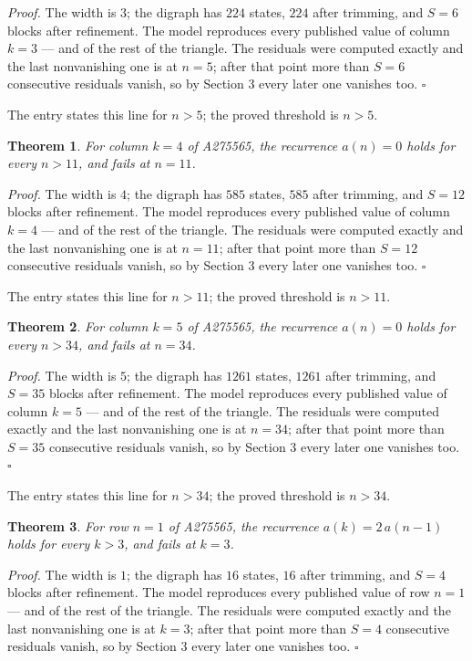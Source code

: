 \documentclass[11pt]{article}
\newtheorem{theorem}{Theorem}
\theoremstyle{definition}
\begin{document}
{\itshape Proof.} The width is $3$; the digraph has $224$ states, $224$ after trimming, and $S = 6$ blocks after refinement. The model reproduces every published value of column $k = 3$ --- and of the rest of the triangle. The residuals were computed exactly and the last nonvanishing one is at $n = 5$; after that point more than $S = 6$ consecutive residuals vanish, so by Section 3 every later one vanishes too. $\square$

The entry states this line for $n > 5$; the proved threshold is $n > 5$.

\begin{theorem} For column $k = 4$ of A275565, the recurrence $a(n) = 0$ holds for every $n > 11$, and fails at $n = 11$.\end{theorem}

{\itshape Proof.} The width is $4$; the digraph has $585$ states, $585$ after trimming, and $S = 12$ blocks after refinement. The model reproduces every published value of column $k = 4$ --- and of the rest of the triangle. The residuals were computed exactly and the last nonvanishing one is at $n = 11$; after that point more than $S = 12$ consecutive residuals vanish, so by Section 3 every later one vanishes too. $\square$

The entry states this line for $n > 11$; the proved threshold is $n > 11$.

\begin{theorem} For column $k = 5$ of A275565, the recurrence $a(n) = 0$ holds for every $n > 34$, and fails at $n = 34$.\end{theorem}

{\itshape Proof.} The width is $5$; the digraph has $1261$ states, $1261$ after trimming, and $S = 35$ blocks after refinement. The model reproduces every published value of column $k = 5$ --- and of the rest of the triangle. The residuals were computed exactly and the last nonvanishing one is at $n = 34$; after that point more than $S = 35$ consecutive residuals vanish, so by Section 3 every later one vanishes too. $\square$

The entry states this line for $n > 34$; the proved threshold is $n > 34$.

\begin{theorem} For row $n = 1$ of A275565, the recurrence $a(k) = 2\,a(n-1)$ holds for every $k > 3$, and fails at $k = 3$.\end{theorem}

{\itshape Proof.} The width is $1$; the digraph has $16$ states, $16$ after trimming, and $S = 4$ blocks after refinement. The model reproduces every published value of row $n = 1$ --- and of the rest of the triangle. The residuals were computed exactly and the last nonvanishing one is at $k = 3$; after that point more than $S = 4$ consecutive residuals vanish, so by Section 3 every later one vanishes too. $\square$
\end{document}
